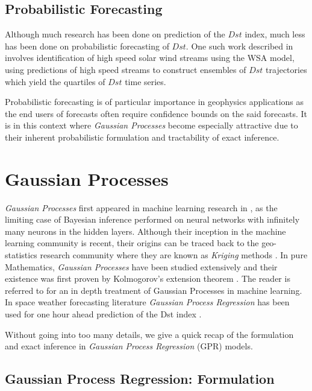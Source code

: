 \documentclass{article}
\begin{document}
\subsection{Probabilistic Forecasting}
Although much research has been done on prediction of the $Dst$ index, much less has been done on probabilistic forecasting of $Dst$. One such work described in \citet{McPherron:2013} involves identification of high speed solar wind streams using the WSA model, using predictions of high speed streams to construct ensembles of $Dst$ trajectories which yield the quartiles of $Dst$ time series. 

Probabilistic forecasting is of particular importance in geophysics applications as the end users of forecasts often require confidence bounds on the said forecasts. It is in this context where \emph{Gaussian Processes} become especially attractive due to their inherent probabilistic formulation and tractability of exact inference.


\section{Gaussian Processes}

\emph{Gaussian Processes} first appeared in machine learning research
in \citet{Neal:1996:BLN:525544}, as the limiting case of Bayesian
inference performed on neural networks with infinitely many neurons in
the hidden layers. Although their inception in the machine learning
community is recent, their origins can be traced back to the
geo-statistics research community where they are known as
\emph{Kriging} methods \citep{krige1951statistical}. In pure
Mathematics, \emph{Gaussian Processes} have been studied extensively
and their existence was first proven by Kolmogorov's extension theorem
\citep{tao2011introduction}. The reader is referred to
\citet{Rasmussen:2005:GPM:1162254} for an in depth treatment of
Gaussian Processes in machine learning. In space weather forecasting
literature \emph{Gaussian Process Regression} has been used for one
hour ahead prediction of the Dst index \citep{SWE:SWE20479}.

Without going into too many details, we give a quick recap of the
formulation and exact inference in \emph{Gaussian Process Regression} (GPR) models. 

\subsection{Gaussian Process Regression: Formulation}
\end{document}
